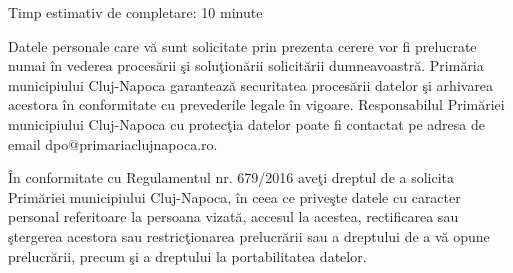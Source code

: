 \documentclass[8pt,a4paper,landscape]{extarticle}
\begin{document}
\vspace{0.15cm}

Timp estimativ de completare: 10 minute

Datele personale care vă sunt solicitate prin prezenta cerere vor fi prelucrate numai în vederea procesării şi soluţionării solicitării dumneavoastră. Primăria municipiului Cluj-Napoca garantează securitatea procesării datelor şi arhivarea acestora în conformitate cu prevederile legale în vigoare. Responsabilul Primăriei municipiului Cluj-Napoca cu protecţia datelor poate fi contactat pe adresa de email dpo@primariaclujnapoca.ro.

În conformitate cu Regulamentul nr. 679/2016 aveţi dreptul de a solicita Primăriei municipiului Cluj-Napoca, în ceea ce priveşte datele cu caracter personal referitoare la persoana vizată, accesul la acestea, rectificarea sau ştergerea acestora sau restricţionarea prelucrării sau a dreptului de a vă opune prelucrării, precum şi a dreptului la portabilitatea datelor.
\end{document}
